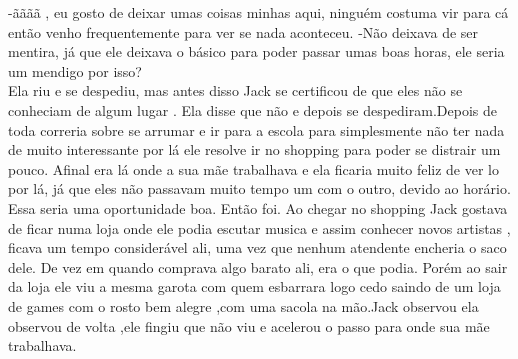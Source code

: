 \documentclass{book}
\begin{document}
-ãããã , eu gosto de deixar umas coisas minhas aqui, ninguém costuma vir para cá então venho frequentemente para ver se nada aconteceu. -Não deixava de ser mentira, já que ele deixava o básico para poder passar umas boas horas, ele seria um mendigo por isso?\\
Ela riu e se despediu, mas antes disso Jack se certificou de que eles não se conheciam de algum lugar . Ela disse que não e depois se despediram.Depois de toda correria sobre se arrumar e ir para a escola para simplesmente não ter nada de muito interessante por lá ele resolve ir no shopping para poder se distrair um pouco. Afinal era lá onde a sua mãe trabalhava e ela ficaria muito feliz de ver lo por lá, já que eles não passavam muito tempo um com o outro, devido ao horário. Essa seria uma oportunidade boa. Então foi. Ao chegar no shopping Jack gostava de ficar numa loja onde ele podia escutar musica e assim conhecer novos artistas , ficava um tempo considerável ali, uma vez que nenhum atendente encheria o saco dele. De vez em quando comprava algo barato ali, era o que podia. Porém ao sair da loja ele viu a mesma garota com quem esbarrara logo cedo saindo de um loja de games com o rosto bem alegre ,com uma sacola na mão.Jack observou ela observou de volta ,ele fingiu que não viu e acelerou o passo para onde sua mãe trabalhava.\\
\end{document}

